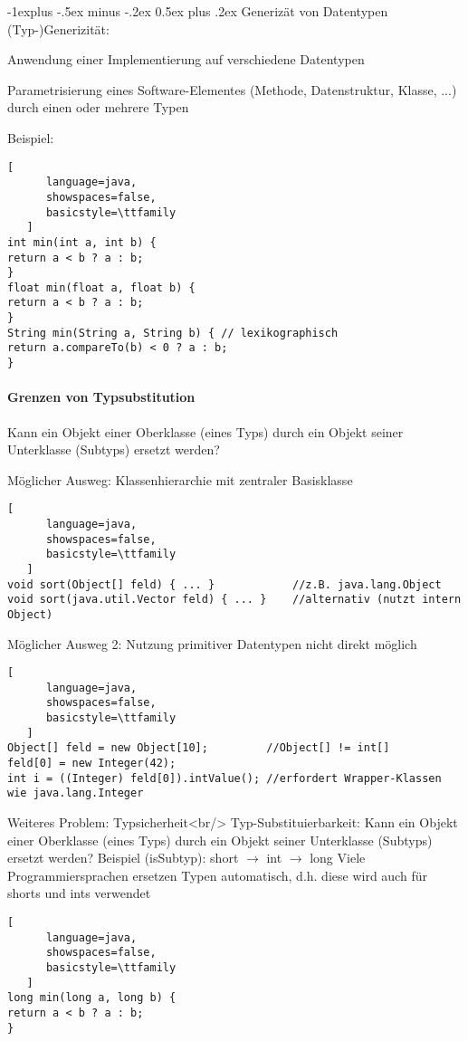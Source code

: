 \documentclass[10pt]{article}
\makeatletter
\renewcommand{\subsection}{\@startsection{subsection}{2}{0mm}%
                                {-1explus -.5ex minus -.2ex}%
                                {0.5ex plus .2ex}%
                                {\normalfont\normalsize\bfseries}}
\makeatother
\begin{document}
\begin{itemize*}
\subsection{Generizät von Datentypen}
(Typ-)Generizität:
\begin{itemize*}
  \item Anwendung einer Implementierung auf verschiedene Datentypen
  \item Parametrisierung eines Software-Elementes (Methode, Datenstruktur, Klasse, ...) durch einen oder mehrere Typen
\end{itemize*}
Beispiel:
\begin{lstlisting}[
      language=java,
      showspaces=false,
      basicstyle=\ttfamily
   ]
int min(int a, int b) {
return a < b ? a : b;
}
float min(float a, float b) {
return a < b ? a : b;
}
String min(String a, String b) { // lexikographisch
return a.compareTo(b) < 0 ? a : b;
}
\end{lstlisting}


\paragraph{Grenzen von Typsubstitution}
Kann ein Objekt einer Oberklasse (eines Typs) durch ein Objekt seiner Unterklasse (Subtyps) ersetzt werden?

Möglicher Ausweg: Klassenhierarchie mit zentraler Basisklasse
\begin{lstlisting}[
      language=java,
      showspaces=false,
      basicstyle=\ttfamily
   ]
void sort(Object[] feld) { ... }            //z.B. java.lang.Object
void sort(java.util.Vector feld) { ... }    //alternativ (nutzt intern Object)
\end{lstlisting}

Möglicher Ausweg 2: Nutzung primitiver Datentypen nicht direkt möglich
\begin{lstlisting}[
      language=java,
      showspaces=false,
      basicstyle=\ttfamily
   ]
Object[] feld = new Object[10];         //Object[] != int[]
feld[0] = new Integer(42);
int i = ((Integer) feld[0]).intValue(); //erfordert Wrapper-Klassen wie java.lang.Integer
\end{lstlisting}


Weiteres Problem: Typsicherheit<br/>
Typ-Substituierbarkeit: Kann ein Objekt einer Oberklasse (eines Typs) durch ein Objekt seiner Unterklasse (Subtyps) ersetzt werden?
Beispiel (isSubtyp): short $\rightarrow$ int $\rightarrow$ long 
Viele Programmiersprachen ersetzen Typen automatisch, d.h. diese wird auch für shorts und ints verwendet
\begin{lstlisting}[
      language=java,
      showspaces=false,
      basicstyle=\ttfamily
   ]
long min(long a, long b) {
return a < b ? a : b;
}
\end{lstlisting}



\end{itemize*}
\end{document}
